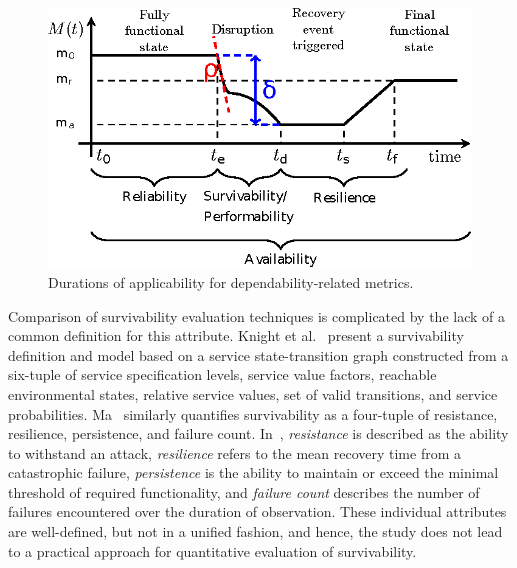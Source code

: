 \documentclass[review]{elsarticle}
\begin{document}
\begin{figure}[!ht]
\centering
\includegraphics[width=.9\columnwidth]{fom}
\caption{Durations of applicability for dependability-related metrics.}
\label{fig:fom}
\end{figure}

Comparison of survivability evaluation techniques is complicated by the lack of a common definition for this attribute. Knight et al.~\cite{KnS03} present a survivability definition and model based on a service state-transition graph constructed from a six-tuple of service specification levels, service value factors, reachable environmental states, relative service values, set of valid transitions, and service probabilities. Ma~\cite{Ma12} similarly quantifies survivability as a four-tuple of resistance, resilience, persistence, and failure count. In~\cite{Ma12}, \emph{resistance} is described as the ability to withstand an attack, \emph{resilience} refers to the mean recovery time from a catastrophic failure, \emph{persistence} is the ability to maintain or exceed the minimal threshold of required functionality, and \emph{failure count} describes the number of failures encountered over the duration of observation. These individual attributes are well-defined, but not in a unified fashion, and hence, the study does not lead to a practical approach for quantitative evaluation of survivability.
\end{document}
